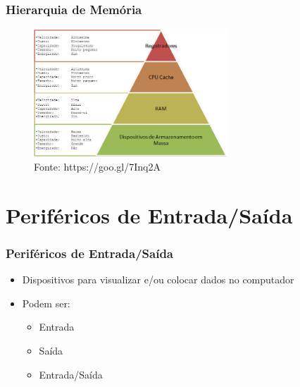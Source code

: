 \documentclass[aspectratio=169,
				xcolor=table]{beamer}
\begin{document}
		\begin{frame}
			\frametitle{Hierarquia de Memória}
			\begin{figure}
			\centering
				\includegraphics[width=0.65\textwidth, keepaspectratio]{../figs/cap04/memoria} 
				\\
				\hspace{5cm}
				\tiny Fonte: https://goo.gl/7Inq2A
			\end{figure}
			

		\end{frame}
	
	\section{Periféricos de Entrada/Saída}
	\begin{frame}
		\frametitle{Periféricos de Entrada/Saída}
		\begin{itemize}
			\item Dispositivos para visualizar e/ou colocar dados no computador
			\vspace{1em}
			\item Podem ser:
			\begin{itemize}
				\item Entrada
				\item Saída
				\item Entrada/Saída
			\end{itemize}
		\end{itemize}
	\end{frame}
	
\end{document}
